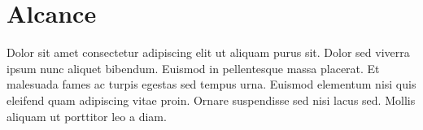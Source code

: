 \section{Alcance}

Dolor sit amet consectetur adipiscing elit ut aliquam purus sit. Dolor sed viverra ipsum nunc aliquet bibendum. Euismod in pellentesque massa placerat. Et malesuada fames ac turpis egestas sed tempus urna. Euismod elementum nisi quis eleifend quam adipiscing vitae proin. Ornare suspendisse sed nisi lacus sed. Mollis aliquam ut porttitor leo a diam.

